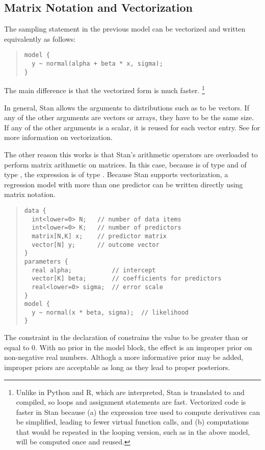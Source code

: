 \subsection{Matrix Notation and Vectorization}

The sampling statement in the previous model can be vectorized and
written equivalently as follows:
%
\begin{quote}
\begin{Verbatim}
model {
  y ~ normal(alpha + beta * x, sigma);
}
\end{Verbatim}
\end{quote}
%
The main difference is that the vectorized form is much faster.%
%
\footnote{Unlike in Python and R, which are interpreted, Stan is
  translated to \Cpp and compiled, so loops and assignment statements
  are fast.  Vectorized code is faster in Stan because (a) the
  expression tree used to compute derivatives can be simplified,
  leading to fewer virtual function calls, and (b) computations that
  would be repeated in the looping version, such as 
  in the above model, will be computed once and reused.}

In general, Stan allows the arguments to distributions such as
 to be vectors.  If any of the other arguments are
vectors or arrays, they have to be the same size.  If any of the other
arguments is a scalar, it is reused for each vector entry.  See
 for more information on vectorization.

The other reason this works is that Stan's arithmetic operators are
overloaded to perform matrix arithmetic on matrices.  In this case,
because  is of type  and  of type
, the expression  is of type .
Because Stan supports vectorization, a regression model with more than
one predictor can be written directly using matrix notation.
%
\begin{quote}
\begin{Verbatim}
data {
  int<lower=0> N;   // number of data items
  int<lower=0> K;   // number of predictors
  matrix[N,K] x;    // predictor matrix
  vector[N] y;      // outcome vector
}
parameters {
  real alpha;           // intercept
  vector[K] beta;       // coefficients for predictors
  real<lower=0> sigma;  // error scale
}
model {
  y ~ normal(x * beta, sigma);  // likelihood
}
\end{Verbatim}
\end{quote}
%
The constraint  in the declaration of 
constrains the value to be greater than or equal to 0.  With no prior
in the model block, the effect is an improper prior on non-negative
real numbers.  Althogh a more informative prior may be added, improper
priors are acceptable as long as they lead to proper posteriors.

